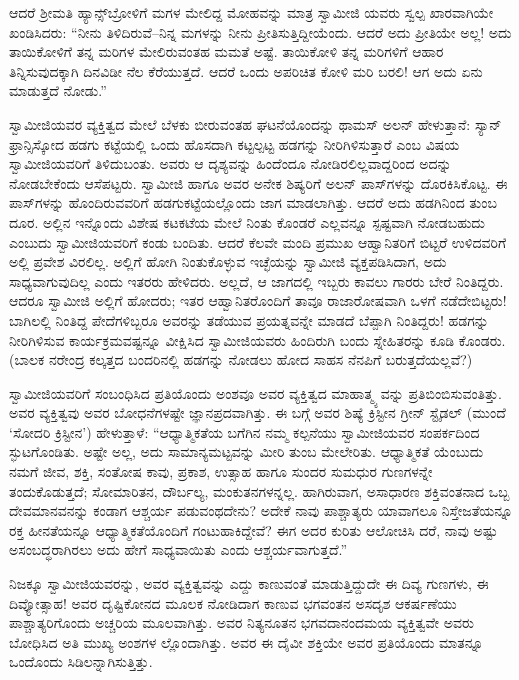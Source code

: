 ಆದರೆ ಶ್ರೀಮತಿ ಹ್ಯಾನ್ಸ್​ಬ್ರೋಳಿಗೆ ಮಗಳ ಮೇಲಿದ್ದ ಮೋಹವನ್ನು ಮಾತ್ರ ಸ್ವಾಮೀಜಿ ಯವರು ಸ್ವಲ್ಪ ಖಾರವಾಗಿಯೇ ಖಂಡಿಸಿದರು: “ನೀನು ತಿಳಿದಿರುವೆ–ನಿನ್ನ ಮಗಳನ್ನು ನೀನು ಪ್ರೀತಿಸುತ್ತಿದ್ದೀಯೆಂದು. ಆದರೆ ಅದು ಪ್ರೀತಿಯೇ ಅಲ್ಲ! ಅದು ತಾಯಿಕೋಳಿಗೆ ತನ್ನ ಮರಿಗಳ ಮೇಲಿರುವಂತಹ ಮಮತೆ ಅಷ್ಟೆ. ತಾಯಿಕೋಳಿ ತನ್ನ ಮರಿಗಳಿಗೆ ಆಹಾರ ತಿನ್ನಿಸುವುದಕ್ಕಾಗಿ ದಿನವಿಡೀ ನೆಲ ಕೆರೆಯುತ್ತದೆ. ಆದರೆ ಒಂದು ಅಪರಿಚಿತ ಕೋಳಿ ಮರಿ ಬರಲಿ! ಆಗ ಅದು ಏನು ಮಾಡುತ್ತದೆ ನೋಡು.”

ಸ್ವಾಮೀಜಿಯವರ ವ್ಯಕ್ತಿತ್ವದ ಮೇಲೆ ಬೆಳಕು ಬೀರುವಂತಹ ಘಟನೆಯೊಂದನ್ನು ಥಾಮಸ್ ಅಲನ್ ಹೇಳುತ್ತಾನೆ: ಸ್ಯಾನ್​ಫ್ರಾನ್ಸಿಸ್ಕೋದ ಹಡಗು ಕಟ್ಟೆಯಲ್ಲಿ ಒಂದು ಹೊಸದಾಗಿ ಕಟ್ಟಲ್ಪಟ್ಟ ಹಡಗನ್ನು ನೀರಿಗಿಳಿಸುತ್ತಾರೆ ಎಂಬ ವಿಷಯ ಸ್ವಾಮೀಜಿಯವರಿಗೆ ತಿಳಿದುಬಂತು. ಅವರು ಆ ದೃಶ್ಯವನ್ನು ಹಿಂದೆಂದೂ ನೋಡಿರಲಿಲ್ಲವಾದ್ದರಿಂದ ಅದನ್ನು ನೋಡಬೇಕೆಂದು ಆಸೆಪಟ್ಟರು. ಸ್ವಾಮೀಜಿ ಹಾಗೂ ಅವರ ಅನೇಕ ಶಿಷ್ಯರಿಗೆ ಅಲನ್ ಪಾಸ್​ಗಳನ್ನು ದೊರಕಿಸಿಕೊಟ್ಟ. ಈ ಪಾಸ್​ಗಳನ್ನು ಹೊಂದಿರುವವರಿಗೆ ಹಡಗುಕಟ್ಟೆಯಲ್ಲೊಂದು ಜಾಗ ಮಾಡಲಾಗಿತ್ತು. ಆದರೆ ಅದು ಹಡಗಿನಿಂದ ತುಂಬ ದೂರ. ಅಲ್ಲಿನ ಇನ್ನೊಂದು ವಿಶೇಷ ಕಟಕಟೆಯ ಮೇಲೆ ನಿಂತು ಕೊಂಡರೆ ಎಲ್ಲವನ್ನೂ ಸ್ಪಷ್ಟವಾಗಿ ನೋಡಬಹುದು ಎಂಬುದು ಸ್ವಾಮೀಜಿಯವರಿಗೆ ಕಂಡು ಬಂದಿತು. ಆದರೆ ಕೆಲವೇ ಮಂದಿ ಪ್ರಮುಖ ಆಹ್ವಾನಿತರಿಗೆ ಬಿಟ್ಟರೆ ಉಳಿದವರಿಗೆ ಅಲ್ಲಿ ಪ್ರವೇಶ ವಿರಲಿಲ್ಲ. ಅಲ್ಲಿಗೆ ಹೋಗಿ ನಿಂತುಕೊಳ್ಳುವ ಇಚ್ಛೆಯನ್ನು ಸ್ವಾಮೀಜಿ ವ್ಯಕ್ತಪಡಿಸಿದಾಗ, ಅದು ಸಾಧ್ಯವಾಗುವುದಿಲ್ಲ ಎಂದು ಇತರರು ಹೇಳಿದರು. ಅಲ್ಲದೆ, ಆ ಜಾಗದಲ್ಲಿ ಇಬ್ಬರು ಕಾವಲು ಗಾರರು ಬೇರೆ ನಿಂತಿದ್ದರು. ಆದರೂ ಸ್ವಾಮೀಜಿ ಅಲ್ಲಿಗೆ ಹೋದರು; ಇತರ ಆಹ್ವಾನಿತರೊಂದಿಗೆ ತಾವೂ ರಾಜಾರೋಷವಾಗಿ ಒಳಗೆ ನಡೆದೇಬಿಟ್ಟರು!ಬಾಗಿಲಲ್ಲಿ ನಿಂತಿದ್ದ ಪೇದೆಗಳಿಬ್ಬರೂ ಅವರನ್ನು ತಡೆಯುವ ಪ್ರಯತ್ನವನ್ನೇ ಮಾಡದೆ ಬೆಪ್ಪಾಗಿ ನಿಂತಿದ್ದರು! ಹಡಗನ್ನು ನೀರಿಗಿಳಿಸುವ ಕಾರ್ಯಕ್ರಮವಷ್ಟನ್ನೂ ವೀಕ್ಷಿಸಿದ ಸ್ವಾಮೀಜಿಯವರು ಹಿಂದಿರುಗಿ ಬಂದು ಸ್ನೇಹಿತರನ್ನು ಕೂಡಿ ಕೊಂಡರು. (ಬಾಲಕ ನರೇಂದ್ರ ಕಲ್ಕತ್ತದ ಬಂದರಿನಲ್ಲಿ ಹಡಗನ್ನು ನೋಡಲು ಹೋದ ಸಾಹಸ ನೆನಪಿಗೆ ಬರುತ್ತದೆಯಲ್ಲವೆ?)

ಸ್ವಾಮೀಜಿಯವರಿಗೆ ಸಂಬಂಧಿಸಿದ ಪ್ರತಿಯೊಂದು ಅಂಶವೂ ಅವರ ವ್ಯಕ್ತಿತ್ವದ ಮಾಹಾತ್ಮ್ಯ ವನ್ನು ಪ್ರತಿಬಿಂಬಿಸುವಂತಿತ್ತು. ಅವರ ವ್ಯಕ್ತಿತ್ವವು ಅವರ ಬೋಧನೆಗಳಷ್ಟೇ ಜ್ಞಾನಪ್ರದವಾಗಿತ್ತು. ಈ ಬಗ್ಗೆ ಅವರ ಶಿಷ್ಯೆ ಕ್ರಿಸ್ಟೀನ ಗ್ರೀನ್ ಸ್ಟೈಡಲ್ (ಮುಂದೆ ‘ಸೋದರಿ ಕ್ರಿಸ್ಟೀನ’) ಹೇಳುತ್ತಾಳೆ: “ಆಧ್ಯಾತ್ಮಿಕತೆಯ ಬಗೆಗಿನ ನಮ್ಮ ಕಲ್ಪನೆಯು ಸ್ವಾಮೀಜಿಯವರ ಸಂಪರ್ಕದಿಂದ ಸ್ಫುಟಗೊಂಡಿತು. ಅಷ್ಟೇ ಅಲ್ಲ, ಅದು ಸಾಮಾನ್ಯಮಟ್ಟವನ್ನು ಮೀರಿ ತುಂಬ ಮೇಲೇರಿತು. ಆಧ್ಯಾತ್ಮಿಕತೆ ಯೆಂಬುದು ನಮಗೆ ಜೀವ, ಶಕ್ತಿ, ಸಂತೋಷ ಕಾವು, ಪ್ರಕಾಶ, ಉತ್ಸಾಹ ಹಾಗೂ ಸುಂದರ ಸುಮಧುರ ಗುಣಗಳನ್ನೇ ತಂದುಕೊಡುತ್ತದೆ; ಸೋಮಾರಿತನ, ದೌರ್ಬಲ್ಯ, ಮಂಕುತನಗಳನ್ನಲ್ಲ. ಹಾಗಿರುವಾಗ, ಅಸಾಧಾರಣ ಶಕ್ತಿವಂತನಾದ ಒಬ್ಬ ದೇವಮಾನವನನ್ನು ಕಂಡಾಗ ಆಶ್ಚರ್ಯ ಪಡುವಂಥದೇನು? ಅದೇಕೆ ನಾವು ಪಾಶ್ಚಾತ್ಯರು ಯಾವಾಗಲೂ ನಿಸ್ತೇಜತೆಯನ್ನೂ ರಕ್ತ ಹೀನತೆಯನ್ನೂ ಆಧ್ಯಾತ್ಮಿಕತೆಯೊಂದಿಗೆ ಗಂಟುಹಾಕಿದ್ದೇವೆ? ಈಗ ಅದರ ಕುರಿತು ಆಲೋಚಿಸಿ ದರೆ, ನಾವು ಅಷ್ಟು ಅಸಂಬದ್ಧರಾಗಿರಲು ಅದು ಹೇಗೆ ಸಾಧ್ಯವಾಯಿತು ಎಂದು ಆಶ್ಚರ್ಯವಾಗುತ್ತದೆ.”

ನಿಜಕ್ಕೂ ಸ್ವಾಮೀಜಿಯವರನ್ನು, ಅವರ ವ್ಯಕ್ತಿತ್ವವನ್ನು ಎದ್ದು ಕಾಣುವಂತೆ ಮಾಡುತ್ತಿದ್ದುದೇ ಈ ದಿವ್ಯ ಗುಣಗಳು, ಈ ದಿವ್ಯೋತ್ಸಾಹ! ಅವರ ದೃಷ್ಟಿಕೋನದ ಮೂಲಕ ನೋಡಿದಾಗ ಕಾಣುವ ಭಗವಂತನ ಅಸದೃಶ ಆಕರ್ಷಣೆಯು ಪಾಶ್ಚಾತ್ಯರಿಗೊಂದು ಅಚ್ಚರಿಯ ಮೂಲವಾಗಿತ್ತು. ಅವರ ನಿತ್ಯನೂತನ ಭಗವದಾನಂದಮಯ ವ್ಯಕ್ತಿತ್ವವೇ ಅವರು ಬೋಧಿಸಿದ ಅತಿ ಮುಖ್ಯ ಅಂಶಗಳ ಲ್ಲೊಂದಾಗಿತ್ತು. ಅವರ ಈ ದೈವೀ ಶಕ್ತಿಯೇ ಅವರ ಪ್ರತಿಯೊಂದು ಮಾತನ್ನೂ ಒಂದೊಂದು ಸಿಡಿಲನ್ನಾಗಿಸುತ್ತಿತ್ತು.

